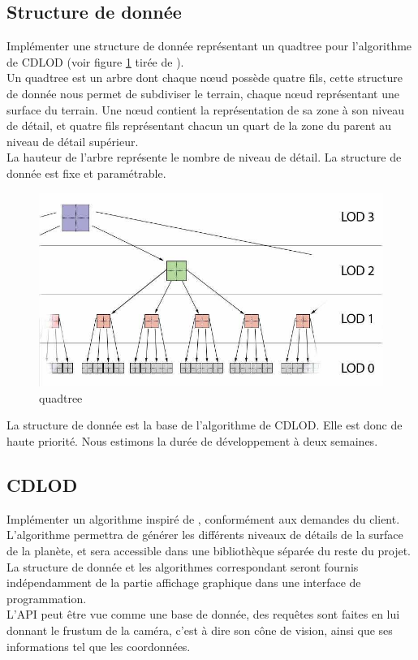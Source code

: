 \documentclass[12pt]{report}
\begin{document}
\subsection{Structure de donnée}

Implémenter une structure de donnée représentant un quadtree pour
l'algorithme de CDLOD (voir figure \ref{fig:quadtree} tirée de 
\cite{CDLOD}).\\
Un quadtree est un arbre dont chaque nœud possède quatre fils, cette
structure de donnée nous permet de subdiviser le terrain, chaque nœud
représentant une surface du terrain. Une nœud contient la représentation
de sa zone à son niveau de détail, et quatre fils représentant chacun un
quart de la zone du parent au niveau de détail supérieur.\\
La hauteur de l'arbre représente le nombre de niveau de détail.
La structure de donnée est fixe et paramétrable.
\begin{center}
\begin{figure}[!h]
  \includegraphics[scale=0.5]{img/Quadtree.png}
  \caption{quadtree \cite{CDLOD}}
  \label{fig:quadtree}
\end{figure}
\end{center}

La structure de donnée est la base de l'algorithme de CDLOD. Elle est
donc de haute priorité. Nous estimons la durée de développement à deux
semaines.\\

\subsection{CDLOD}

Implémenter un algorithme inspiré de \cite{CDLOD}, conformément aux
demandes du client.  L'algorithme permettra de générer les différents
niveaux de détails de la surface de la planète, et sera accessible dans
une bibliothèque séparée du reste du projet. La structure de donnée et
les algorithmes correspondant seront fournis indépendamment de la partie
affichage graphique dans une interface de programmation.\\
L'API peut être vue comme une base de donnée, des requêtes sont faites
en lui donnant le frustum de la caméra, c'est à dire son cône de vision,
ainsi que ses informations tel que les coordonnées.
\end{document}
